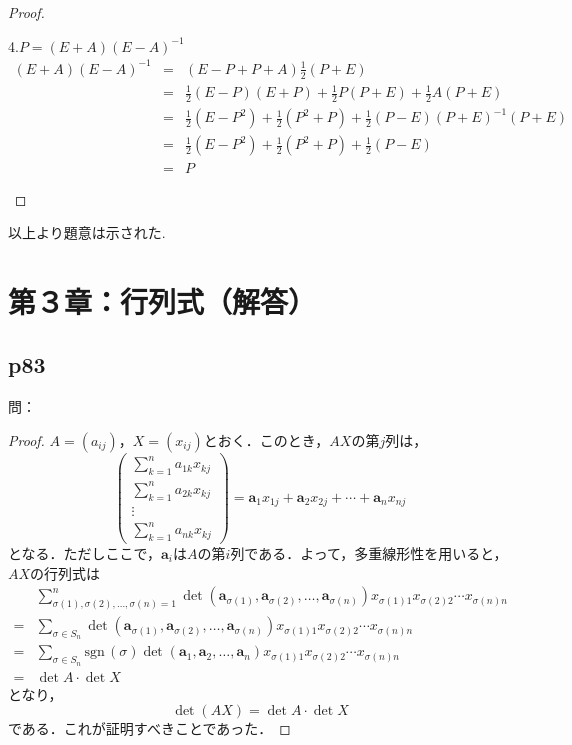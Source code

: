\documentclass[dvipdfmx,uplatex,11pt]{jsarticle}
\theoremstyle{definition}
\begin{document}
\begin{proof}
%
%
%
\newpage
%
%
%
\begin{leftbar}
4.$P= (E + A)(E − A)^{−1}$
\begin{eqnarray*}
(E + A)(E − A)^{−1}&=&(E − P + P + A)\frac{1}{2}(P + E)\\
&=&\frac{1}{2}(E − P)(E + P)+\frac{1}{2}P(P + E)+\frac{1}{2}A(P + E)\\
&=&\frac{1}{2}(E − P^2) +\frac{1}{2}(P^2+P)+\frac{1}{2}(P − E)(P + E)^{−1}(P + E)\\
&=&\frac{1}{2}(E − P^2)+\frac{1}{2}(P^2+P)+\frac{1}{2}(P − E)\\
&=&P
\end{eqnarray*}
\end{leftbar}
\end{proof}
以上より題意は示された.
%
%
%
\newpage
%
%
%
\section{第３章：行列式（解答）}
\subsection{p83}
%
問：
\begin{leftbar}
    \begin{proof}
        $A =(a_{ij})$，$X=(x_{ij})$とおく．このとき，$AX$の第$j$列は，
        \[
            \begin{pmatrix}
                \sum_{k=1}^{n} a_{1k} x_{kj} \\
                \sum_{k=1}^{n} a_{2k} x_{kj} \\
                \vdots \\
                \sum_{k=1}^{n} a_{nk} x_{kj}
            \end{pmatrix}
            = \bm{a}_1 x_{1j}+ \bm{a}_2 x_{2j}+ \cdots + \bm{a}_n x_{nj}
        \]
        となる．ただしここで，$\bm{a}_i$は$A$の第$i$列である．よって，多重線形性を用いると，$AX$の行列式は
        \begin{align*}
            &\sum_{\sigma(1),\sigma(2),\ldots,\sigma(n)=1}^{n}  \det(\bm{a}_{\sigma(1)},\bm{a}_{\sigma(2)},\ldots,\bm{a}_{\sigma(n)}) x_{\sigma(1)1} x_{\sigma(2)2} \cdots x_{\sigma(n)n} \\
            =& \sum_{\sigma \in S_n} \det(\bm{a}_{\sigma(1)},\bm{a}_{\sigma(2)},\ldots,\bm{a}_{\sigma(n)})  x_{\sigma(1)1} x_{\sigma(2)2} \cdots x_{\sigma(n)n} \\
            =& \sum_{\sigma \in S_n}\mathrm{sgn} \,(\sigma) \det(\bm{a}_1,\bm{a}_2,\ldots,\bm{a}_n)  x_{\sigma(1)1} x_{\sigma(2)2} \cdots x_{\sigma(n)n} \\
            =& \det A \cdot \det X
        \end{align*}
        となり，
        \[
            \det (AX)= \det A \cdot \det X
        \]
        である．これが証明すべきことであった．
    \end{proof}
\end{leftbar}
%
\newpage
%
%
%
\end{document}
